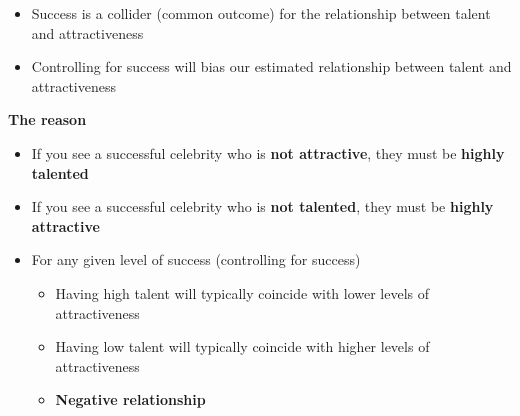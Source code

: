 \documentclass[10pt]{article}
\begin{document}
\begin{itemize}
    \item Success is a collider (common outcome) for the relationship between talent and attractiveness
    \begin{center}
    \end{center}
    \item Controlling for success will bias our estimated relationship between talent and attractiveness
\end{itemize}
\textbf{The reason}
\begin{itemize}
    \item If you see a successful celebrity who is \textbf{not attractive}, they must be \textbf{highly talented}
    \item If you see a successful celebrity who is \textbf{not talented}, they must be \textbf{highly attractive}
    \item For any given level of success (controlling for success)
    \begin{itemize}
        \item Having high talent will typically coincide with lower levels of attractiveness
        \item Having low talent will typically coincide with higher levels of attractiveness
        \item \textbf{Negative relationship}
    \end{itemize}
\end{itemize}
\newpage 
\end{document}
